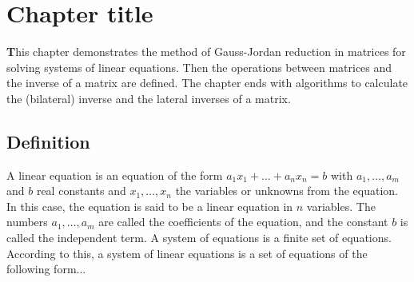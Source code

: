 \chapter{Chapter title}
\lettrine[lines=2,loversize=0.15,nindent=0pt]{\bf \textcolor{myGris}{T}}{}his chapter demonstrates the method of Gauss-Jordan reduction in matrices for solving systems of linear equations. Then the operations between matrices and the inverse of a matrix are defined. The chapter ends with algorithms to calculate the (bilateral) inverse and the lateral inverses of a matrix.
\section{Definition}
\begin{definition}

A linear equation is an equation of the form $a_1x_1+\dots+a_nx_n=b$ with $a_1,\dots,a_m$ and $b$ real constants and $x_1,\dots,x_n$ the  variables or unknowns from the equation. In this case, the equation is said to be a linear equation in $n$ variables. The numbers $a_1,\dots,a_m$ are called the  coefficients of the equation, and the constant $b$ is called the independent term. A system of equations is a finite set of equations. According to this, a system of linear equations is a set of equations of the following form...

\end{definition} 
